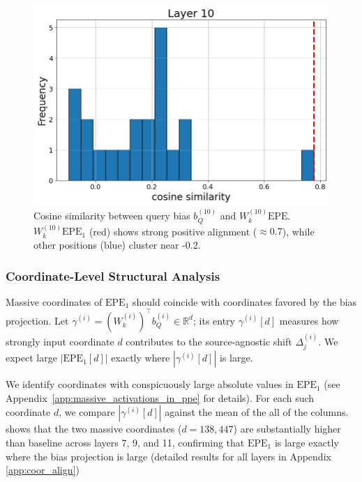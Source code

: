 \documentclass[11pt]{article}
\begin{document}
\begin{figure}[t]
  \includegraphics[width=\columnwidth]{figures/obs2_layer10.png}
  \caption{Cosine similarity between query bias $b_Q^{(10)}$ and $W_k^{(10)}\mathrm{EPE}$. $W_k^{(10)}\mathrm{EPE}_1$ (red) shows strong positive alignment ($\approx 0.7$), while other positions (blue) cluster near -0.2.}
  \label{fig:obs2_layer10}
\end{figure}

\subsubsection{Coordinate-Level Structural Analysis}
\label{sec:wk_structure}
Massive coordinates of $\mathrm{EPE}_1$ should coincide with coordinates favored by the bias projection. Let $\gamma^{(i)}=(W_k^{(i)})^\top b_Q^{(i)}\in\mathbb{R}^d$; its entry $\gamma^{(i)}[d]$ measures how strongly input coordinate $d$ contributes to the source-agnostic shift $\Delta_j^{(i)}$. We expect large $|\mathrm{EPE}_1[d]|$ exactly where $|\gamma^{(i)}[d]|$ is large.

We identify coordinates with conspicuously large absolute values in $\mathrm{EPE}_1$ (see Appendix~\ref{app:massive_activations_in_ppe} for details). For each such coordinate $d$, we compare $|\gamma^{(i)}[d]|$ against the mean of the all of the columns.  shows that the two massive coordinates ($d{=}138,447$) are substantially higher than baseline across layers 7, 9, and 11, confirming that $\mathrm{EPE}_1$ is large exactly where the bias projection is large (detailed results for all layers in Appendix \ref{app:coor_align})
\end{document}
